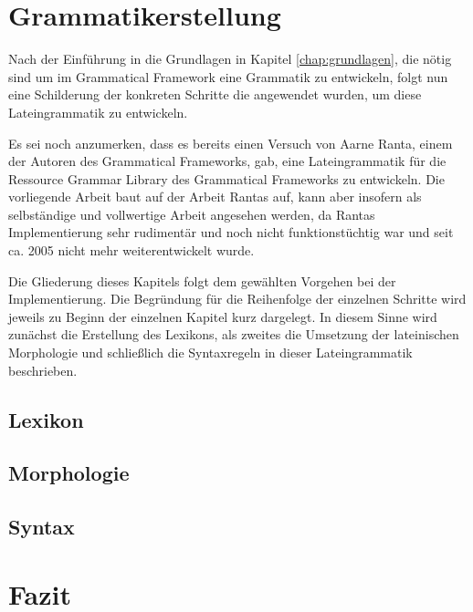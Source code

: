 \documentclass[fontsize=12pt,abstract=on,titlepage,bibliography=totoc,ngerman,listof=totoc]{scrreprt}
\begin{document}
\chapter{Grammatikerstellung}
\label{chap:grammatik}
Nach der Einführung in die Grundlagen in Kapitel \ref{chap:grundlagen}, die nötig sind um im Grammatical Framework eine Grammatik zu entwickeln, folgt nun eine Schilderung der konkreten Schritte die angewendet wurden, um diese Lateingrammatik zu entwickeln. \par
Es sei noch anzumerken, dass es bereits einen Versuch von Aarne Ranta, einem der Autoren des Grammatical Frameworks, gab, eine Lateingrammatik für die Ressource Grammar Library des Grammatical Frameworks zu entwickeln. Die vorliegende Arbeit baut auf der Arbeit Rantas auf, kann aber insofern als selbständige und vollwertige Arbeit angesehen werden, da Rantas Implementierung sehr rudimentär und noch nicht funktionstüchtig war und seit ca. 2005 nicht mehr weiterentwickelt wurde. \par
Die Gliederung dieses Kapitels folgt dem gewählten Vorgehen bei der Implementierung. Die Begründung für die Reihenfolge der einzelnen Schritte wird jeweils zu Beginn der einzelnen Kapitel kurz dargelegt. In diesem Sinne wird zunächst die Erstellung des Lexikons, als zweites die Umsetzung der lateinischen Morphologie und schließlich die Syntaxregeln in dieser Lateingrammatik beschrieben.
\pagebreak
\section{Lexikon}
\label{sec:lexikon}

\FloatBarrier
\pagebreak
\section{Morphologie}
\label{sec:morpho}

\FloatBarrier
\pagebreak
\section{Syntax}
\label{sec:syntax}

\FloatBarrier
\pagebreak
\chapter{Fazit}
\label{chap:fazit}

\FloatBarrier
\pagebreak
\clearpage
{}
\setcounter{page}{1}
%
\printbibliography
\pagebreak
\end{document}
